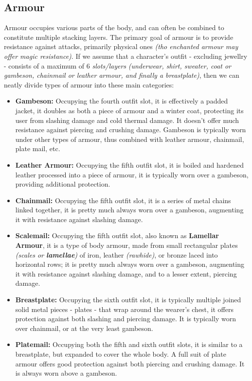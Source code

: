 \documentclass[tikz,openany,11pt,a4paper]{book}
\begin{document}
\subsection{Armour}
Armour occupies various parts of the body, and can often be combined to constitute multiple stacking layers. The primary goal of armour is to provide resistance against attacks, primarily physical ones \textit{(tho enchanted armour may offer magic resistance)}. If we assume that a character's outfit - excluding jewellry - consists of a maximum of 6 \textit{slots/layers} \textit{(underwear, shirt, sweater, coat or gambeson, chainmail or leather armour, and finally a breastplate)}, then we can neatly divide types of armour into these main categories:
\begin{itemize}
\item \textbf{Gambeson:} Occupying the fourth outfit slot, it is effectively a padded jacket, it doubles as both a piece of armour and a winter coat, protecting its user from slashing damage and cold thermal damage. It doesn't offer much resistance against piercing and crushing damage. Gambeson is typically worn under other types of armour, thus combined with leather armour, chainmail, plate mail, etc.
\item \textbf{Leather Armour:} Occupying the fifth outfit slot, it is boiled and hardened leather processed into a piece of armour, it is typically worn over a gambeson, providing additional protection.
\item \textbf{Chainmail:} Occupying the fifth outfit slot, it is a series of metal chains linked together, it is pretty much always worn over a gambeson, augmenting it with resistance against slashing damage.
\item \textbf{Scalemail:} Occupying the fifth outfit slot, also known as \textbf{Lamellar Armour}, it is a type of body armour, made from small rectangular plates \textit{(scales or \textbf{lamellae})} of iron, leather \textit{(rawhide)}, or bronze laced into horizontal rows; it is pretty much always worn over a gambeson, augmenting it with resistance against slashing damage, and to a lesser extent, piercing damage.
\item \textbf{Breastplate:} Occupying the sixth outfit slot, it is typically multiple joined solid metal pieces - plates - that wrap around the wearer's chest, it offers protection against both slashing and piercing damage. It is typically worn over chainmail, or at the very least gambeson.
\item \textbf{Platemail:} Occupying both the fifth and sixth outfit slots, it is similar to a breastplate, but expanded to cover the whole body. A full suit of plate armour offers good protection against both piercing and crushing damage. It is always worn above a gambeson.
\end{itemize}
\end{document}

